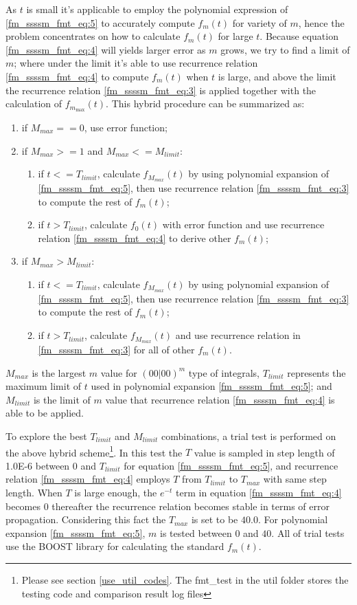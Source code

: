 As $t$ is small it's applicable to employ the polynomial expression of \ref{fm_ssssm_fmt_eq:5} to 
accurately compute $f_{m}(t)$ for variety of $m$, hence the problem concentrates on how to calculate 
$f_{m}(t)$ for large $t$. Because equation \ref{fm_ssssm_fmt_eq:4} will yields larger error as $m$ grows, 
we try to find a limit of $m$; where under the limit it's able to use recurrence relation
\ref{fm_ssssm_fmt_eq:4} to compute $f_{m}(t)$ when $t$ is large, and above the limit the recurrence 
relation \ref{fm_ssssm_fmt_eq:3} is applied together with the calculation of $f_{m_{\max}}(t)$. This 
hybrid procedure can be summarized as:
\begin{enumerate}
 \item if $M_{max} == 0$, use error function;
 \item if $M_{max} >= 1$ and $M_{max} <= M_{limit}$:
 \begin{enumerate}
  \item if $t<=T_{limit}$, calculate $f_{M_{max}}(t)$ by using polynomial expansion of 
  \ref{fm_ssssm_fmt_eq:5}, then use recurrence relation \ref{fm_ssssm_fmt_eq:3} to compute 
  the rest of $f_{m}(t)$;
  \item if $t>T_{limit}$, calculate $f_{0}(t)$ with error function and 
  use recurrence relation \ref{fm_ssssm_fmt_eq:4} to derive other $f_{m}(t)$;
  \end{enumerate}
 \item if $M_{max} > M_{limit}$:
  \begin{enumerate}
     \item if $t<=T_{limit}$, calculate $f_{M_{max}}(t)$ by using polynomial expansion of 
  \ref{fm_ssssm_fmt_eq:5}, then use recurrence relation \ref{fm_ssssm_fmt_eq:3} to compute 
  the rest of $f_{m}(t)$;
   \item  if $t>T_{limit}$, calculate $f_{M_{max}}(t)$ 
  and use recurrence relation in \ref{fm_ssssm_fmt_eq:3} for all of other $f_{m}(t)$.
  \end{enumerate}
 \end{enumerate}
$M_{max}$ is the largest $m$ value for $(00|00)^{m}$ type of integrals, $T_{limit}$
represents the maximum limit of $t$ used in polynomial expansion \ref{fm_ssssm_fmt_eq:5};
and $M_{limit}$ is the limit of $m$ value that recurrence relation \ref{fm_ssssm_fmt_eq:4}
is able to be applied.

To explore the best $T_{limit}$ and $M_{limit}$ combinations, a trial test is performed on
the above hybrid scheme\footnote{Please see section \ref{use_util_codes}. The fmt\_test
in the util folder stores the testing code and comparison result log files}. 
In this test the $T$ value is sampled in step length of 1.0E-6
between $0$ and $T_{limit}$ for equation \ref{fm_ssssm_fmt_eq:5}, and recurrence relation 
\ref{fm_ssssm_fmt_eq:4} employs $T$ from $T_{limit}$ to $T_{max}$ with same step length.
When $T$ is large enough, the $e^{-t}$ term in equation \ref{fm_ssssm_fmt_eq:4} 
becomes 0 thereafter the recurrence relation becomes stable in terms of error propagation.
Considering this fact the $T_{max}$ is set to be $40.0$. For polynomial expansion 
\ref{fm_ssssm_fmt_eq:5}, $m$ is tested between $0$ and $40$. All of trial tests use 
the BOOST library for calculating the standard $f_{m}(t)$.

